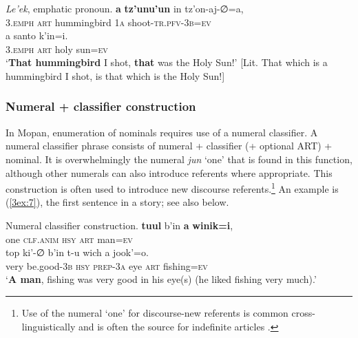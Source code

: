 \documentclass[output=paper]{langsci/langscibook}
\begin{document}
\begin{exe}
\ex\label{3ex:6}
{\emph{Le'ek}}, emphatic pronoun. 
\exi{}
 	{\textbf{a}} 	{\textbf{tz'unu'un}}	 in 		tz'on-aj-∅=a, \\
	{\textsc{3.emph}}	{\textsc{art}}	hummingbird	1{\textsc{a}}	shoot-{\textsc{tr.pfv-3b=ev}} \\
\glt
\exi{}
 	a 	santo	k'in=i.  \\
	3.{\textsc{emph}}	{\textsc{art}}	holy		sun={\textsc{ev}} \\
\glt	`{\textbf{That hummingbird}} I shot, {\textbf{that}} was the Holy Sun!' [Lit. That which is a hummingbird I shot, is that which is the Holy Sun!]
\end{exe}


\subsubsection{Numeral + classifier construction}\label{3sec:213}

In Mopan, enumeration of nominals requires use of a numeral classifier.  A numeral classifier phrase consists of numeral + classifier (+ optional ART) + nominal. %
It is overwhelmingly the numeral {\emph{jun}} `one' that is found in this function,
although other numerals can also introduce referents where appropriate. This construction is often used to introduce new discourse referents.\footnote{Use of the numeral `one' for discourse-new referents is common cross-linguistically and is often the source for indefinite articles \citep[see, e.\,g.,][]{lyons:99}.} An example is (\ref{3ex:7}), the first sentence in a story; see also  below.

\largerpage[2]
\begin{exe}
\ex\label{3ex:7}
Numeral classifier construction. 
\exi{}
 	{\textbf{tuul}} 			b'in 		{\textbf{a}} 	{\textbf{winik=i}}, \\
	one		{\textsc{clf.anim}}	{\textsc{hsy}}		{\textsc{art}}	man{\textsc{=ev}} \\
\glt
\exi{}
\gll	top	ki'-{∅}			b'in		t-u			wich	a		jook'=o. \\
	very	be.good-3{\textsc{b}}	{\textsc{hsy}}	{\textsc{prep-3a}}	eye	{\textsc{art}}	fishing{\textsc{=ev}} \\
\glt 	`{\textbf{A man}}, fishing was very good in his eye(s) (he liked fishing very much).'
\end{exe}
\end{document}
